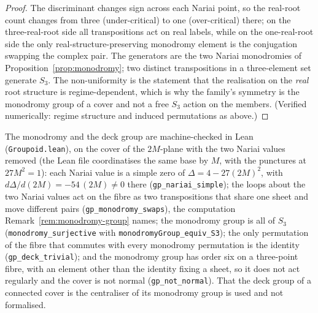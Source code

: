 \documentclass[11pt,a4paper]{article}
\theoremstyle{definition}
\begin{document}
\begin{proof}
The discriminant changes sign across each Nariai point, so the real-root count changes from three (under-critical) to one (over-critical) there; on the three-real-root side all transpositions act on real labels, while on the one-real-root side the only real-structure-preserving
monodromy element is the conjugation swapping the complex pair. The generators are the two Nariai monodromies of Proposition~\ref{prop:monodromy}; two distinct transpositions in a three-element set generate $S_{3}$. The non-uniformity is the statement that the realisation on the \emph{real} root structure is regime-dependent, which is why the family's symmetry is the monodromy group of a cover and not a free $S_{3}$ action on the members. (Verified numerically: regime structure and induced permutations as above.)
\end{proof}

The monodromy and the deck group are machine-checked in Lean (\texttt{Groupoid.lean}), on the cover of the $2M$-plane with the two Nariai values removed (the Lean file coordinatises the same base by $M$, with the punctures at $27M^{2}=1$): each Nariai value is a simple zero of $\Delta=4-27(2M)^{2}$, with $d\Delta/d(2M)=-54\,(2M)\neq0$ there (\texttt{gp\_nariai\_simple}); the loops about the two Nariai values act on the fibre as two transpositions that share one sheet and move different pairs (\texttt{gp\_monodromy\_swaps}), the computation Remark~\ref{rem:monodromy-group} names; the monodromy group is all of $S_{3}$ (\texttt{monodromy\_surjective} with \texttt{monodromyGroup\_equiv\_S3}); the only permutation of the fibre that commutes with every monodromy permutation is the identity (\texttt{gp\_deck\_trivial}); and the monodromy group has order six on a three-point fibre, with an element other than the identity fixing a sheet, so it does not act regularly and the cover is not normal (\texttt{gp\_not\_normal}). That the deck group of a connected cover is the centraliser of its monodromy group is used and not formalised.
\end{document}
